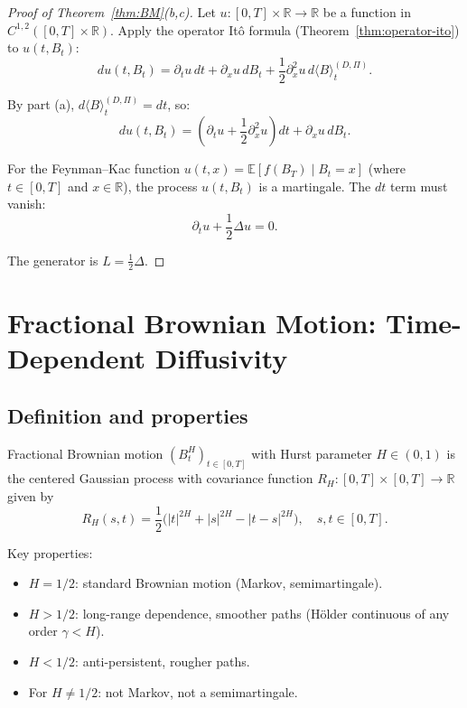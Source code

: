 \documentclass[12pt]{article}
\theoremstyle{plain}
\theoremstyle{definition}
\theoremstyle{remark}
\newcommand{\E}{\mathbb{E}}
\newcommand{\R}{\mathbb{R}}
\begin{document}
\begin{proof}[Proof of Theorem~\ref{thm:BM}(b,c)]
Let $u: [0,T] \times \R \to \R$ be a function in $C^{1,2}([0,T] \times \R)$. Apply the operator It\^{o} formula (Theorem~\ref{thm:operator-ito}) to $u(t, B_t)$:
\begin{equation}\label{eq:BM-ito-applied}
du(t, B_t) = \partial_t u \, dt + \partial_x u \, dB_t + \frac{1}{2}\partial_x^2 u \, d\langle B \rangle_t^{(D,\Pi)}.
\end{equation}

By part (a), $d\langle B \rangle_t^{(D,\Pi)} = dt$, so:
\begin{equation}\label{eq:BM-ito-simplified}
du(t, B_t) = \left(\partial_t u + \frac{1}{2}\partial_x^2 u\right) dt + \partial_x u \, dB_t.
\end{equation}

For the Feynman--Kac function $u(t,x) = \E[f(B_T) \mid B_t = x]$ (where $t \in [0,T]$ and $x \in \R$), the process $u(t, B_t)$ is a martingale. The $dt$ term must vanish:
\begin{equation}\label{eq:BM-heat-eq}
\partial_t u + \frac{1}{2}\Delta u = 0.
\end{equation}

The generator is $L = \frac{1}{2}\Delta$.
\end{proof}

\section{Fractional Brownian Motion: Time-Dependent Diffusivity}\label{sec:fBM}

\subsection{Definition and properties}

Fractional Brownian motion $(B_t^H)_{t \in [0,T]}$ with Hurst parameter $H \in (0,1)$ is the centered Gaussian process with covariance function $R_H: [0,T] \times [0,T] \to \R$ given by
\begin{equation}\label{eq:fBM-covariance}
R_H(s,t) = \frac{1}{2}\bigl(|t|^{2H} + |s|^{2H} - |t-s|^{2H}\bigr), \quad s, t \in [0,T].
\end{equation}

Key properties:
\begin{itemize}
\item $H = 1/2$: standard Brownian motion (Markov, semimartingale).
\item $H > 1/2$: long-range dependence, smoother paths (H\"{o}lder continuous of any order $\gamma < H$).
\item $H < 1/2$: anti-persistent, rougher paths.
\item For $H \neq 1/2$: not Markov, not a semimartingale.
\end{itemize}
\end{document}

